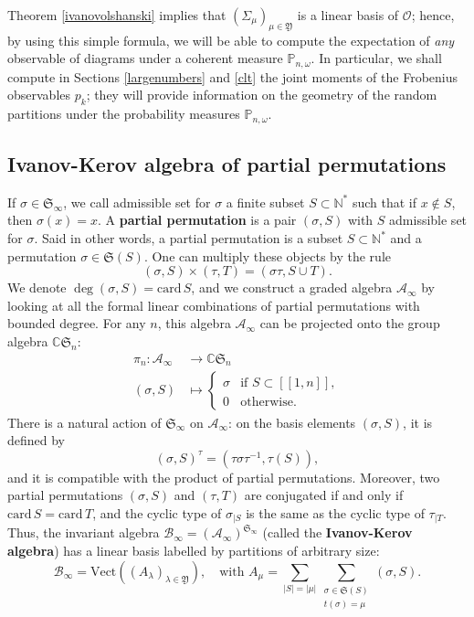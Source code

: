 \documentclass[smallextended,nospthms]{svjour3}
\theoremstyle{remark}
\newcommand{\N}{\mathbb{N}}
\newcommand{\C}{\mathbb{C}}
\newcommand{\sym}{\mathfrak{S}}
\newcommand{\ym}{\mathfrak{Y}}
\newcommand{\card}{\mathrm{card}\,}
\newcommand{\proba}{\mathbb{P}}
\newcommand{\lle}{\left[\!\left[}
\newcommand{\rre}{\right]\!\right]}
\newcommand{\obs}{\mathscr{O}}
\newcommand{\alg}{\mathscr{A}}
\newcommand{\blg}{\mathscr{B}}
\begin{document}
Theorem \ref{ivanovolshanski} implies that $(\varSigma_{\mu})_{\mu \in \ym}$ is a linear basis of $\obs$; hence, by using this simple formula, we will be able to compute the expectation of \emph{any} observable of diagrams under a coherent measure $\proba_{n,\omega}$. In particular, we shall compute in Sections \ref{largenumbers} and \ref{clt} the joint moments of the Frobenius observables $p_{k}$; they will provide information on the geometry of the random partitions under the probability measures $\proba_{n,\omega}$.


\subsection{Ivanov-Kerov algebra of partial permutations}
If $\sigma \in \sym_{\infty}$, we call admissible set for $\sigma$ a finite subset $S \subset \N^{*}$ such that if $x \notin S$, then $\sigma(x)=x$. A \textbf{partial permutation} is a pair $(\sigma,S)$ with $S$ admissible set for $\sigma$. Said in other words, a partial permutation is a subset $S \subset\N^{*}$ and a permutation $\sigma \in \sym(S)$. One can multiply these objects by the rule
$$(\sigma,S)\times(\tau,T)=(\sigma\tau,S\cup T).$$
We denote $\deg (\sigma,S)=\card S$, and we construct a graded algebra $\alg_{\infty}$ by looking at all the formal linear combinations of partial permutations with bounded degree. For any $n$, this algebra $\alg_{\infty}$ can be projected onto the group algebra $\C\sym_{n}$:
\begin{align*}
\pi_{n} : \alg_{\infty}&\to \C\sym_{n}\\
(\sigma,S)&\mapsto \begin{cases}
\sigma &\text{if }S \subset \lle 1,n\rre,\\
0 &\text{otherwise}.
\end{cases}
\end{align*}
There is a natural action of $\sym_{\infty}$ on $\alg_{\infty}$: on the basis elements $(\sigma,S)$, it is defined by
$$(\sigma,S)^{\tau}=(\tau\sigma\tau^{-1},\tau(S)),$$
and it is compatible with the product of partial permutations. Moreover, two partial permutations $(\sigma,S)$ and $(\tau,T)$ are conjugated if and only if $\card S=\card T$, and the cyclic type of $\sigma_{|S}$ is the same as the cyclic type of $\tau_{|T}$. Thus, the invariant algebra $\blg_{\infty}=(\alg_{\infty})^{\sym_{\infty}}$ (called the \textbf{Ivanov-Kerov algebra}) has a linear basis labelled by partitions of arbitrary size:
$$\blg_{\infty}=\mathrm{Vect}((A_{\lambda})_{\lambda \in \ym}),\quad\text{with }A_{\mu}=\sum_{|S|=|\mu|}\sum_{\substack{\sigma \in \sym(S)\\ t(\sigma)=\mu}}(\sigma,S).$$
\end{document}
